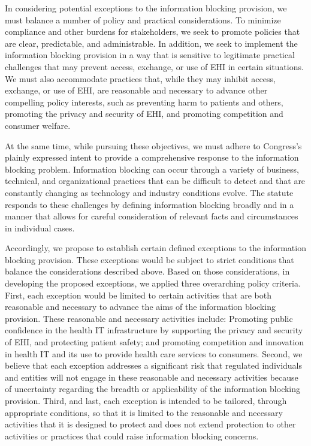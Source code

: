\documentclass[twoside,11pt]{article}
\begin{document}
          In considering potential exceptions to the information blocking provision, we must balance a number of policy and practical considerations. To minimize compliance and other burdens for stakeholders, we seek to promote policies that are clear, predictable, and administrable. In addition, we seek to implement the information blocking provision in a way that is sensitive to legitimate practical challenges that may prevent access, exchange, or use of EHI in certain situations. We must also accommodate practices that, while they may inhibit access, exchange, or use of EHI, are reasonable and necessary to advance other compelling policy interests, such as preventing harm to patients and others, promoting the privacy and security of EHI, and promoting competition and consumer welfare.


          At the same time, while pursuing these objectives, we must adhere to Congress's plainly expressed intent to provide a comprehensive response to the information blocking problem. Information blocking can occur through a variety of business, technical, and organizational practices that can be difficult to detect and that are constantly changing as technology and industry conditions evolve. The statute responds to these challenges by defining information blocking broadly and in a manner that allows for careful consideration of relevant facts and circumstances in individual cases.


          Accordingly, we propose to establish certain defined exceptions to the information blocking provision. These exceptions would be subject to strict conditions that balance the considerations described above. Based on those considerations, in developing the proposed exceptions, we applied three overarching policy criteria. First, each exception would be limited to certain activities that are both reasonable and necessary to advance the aims of the information blocking provision. These reasonable and necessary activities include: Promoting public confidence in the health IT infrastructure by supporting the privacy and security of EHI, and protecting patient safety; and promoting competition and innovation in health IT and its use to provide health care services to consumers. Second, we believe that each exception addresses a significant risk that regulated individuals and entities will not engage in these reasonable and necessary activities because of uncertainty regarding the breadth or applicability of the information blocking provision. Third, and last, each exception is intended to be tailored, through appropriate conditions, so that it is limited to the reasonable and necessary activities that it is designed to protect and does not extend protection to other activities or practices that could raise information blocking concerns.
\end{document}

